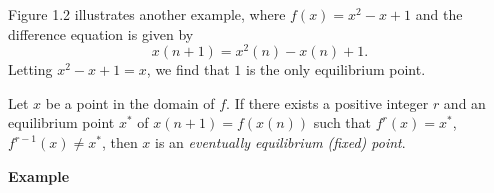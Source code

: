 Figure 1.2 illustrates another example, where $f(x)=x^2-x+1$ and the difference equation is given by
\[x(n+1)=x^2(n)-x(n)+1.\]
Letting $x^2-x+1=x$, we find that $1$ is the only equilibrium point.

\begin{definition}
    Let $x$ be a point in the domain of $f$. If there exists a positive integer $r$ and an equilibrium point $x^*$ of $x(n+1)=f(x(n))$ such that $f^r(x)=x^*$, $f^{r-1}(x)\neq x^*$, then $x$ is an \textit{eventually equilibrium (fixed) point}.
\end{definition}

\textbf{Example}


